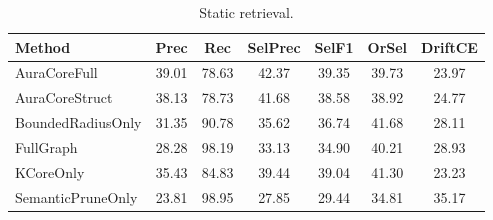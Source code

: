 \begin{table}[t]\centering\small
\begin{tabular}{lcccccc}
\toprule
Method & Prec & Rec & SelPrec & SelF1 & OrSel & DriftCE \\
\midrule
AuraCoreFull & 39.01 & 78.63 & 42.37 & 39.35 & 39.73 & 23.97 \\
AuraCoreStruct & 38.13 & 78.73 & 41.68 & 38.58 & 38.92 & 24.77 \\
BoundedRadiusOnly & 31.35 & 90.78 & 35.62 & 36.74 & 41.68 & 28.11 \\
FullGraph & 28.28 & 98.19 & 33.13 & 34.90 & 40.21 & 28.93 \\
KCoreOnly & 35.43 & 84.83 & 39.44 & 39.04 & 41.30 & 23.23 \\
SemanticPruneOnly & 23.81 & 98.95 & 27.85 & 29.44 & 34.81 & 35.17 \\
\bottomrule
\end{tabular}
\caption{Static retrieval.}
\end{table}
